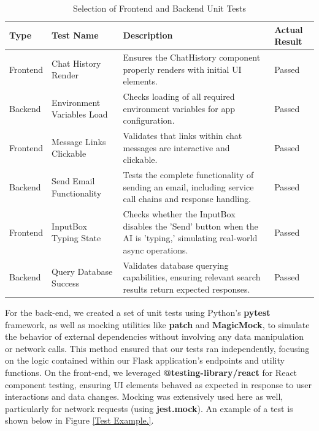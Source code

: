 \documentclass{l4proj}
\begin{document}
\begin{table}[htbp]
\centering
\renewcommand{\arraystretch}{1} %
\begin{tabular}{
    |>{\centering\arraybackslash}p{2cm}
    |>{\centering\arraybackslash}p{2cm}
    |p{6.5cm}
    |>{\centering\arraybackslash}p{2cm}|}
\hline
\rowcolor{HeaderColor}Type & Test Name & Description & Actual Result \\
\hline
\rowcolor{RowColor}Frontend & Chat History Render & Ensures the ChatHistory component properly renders with initial UI elements. & Passed \\
\hline
Backend & Environment Variables Load & Checks loading of all required environment variables for app configuration. & Passed \\
\hline
\rowcolor{RowColor}Frontend & Message Links Clickable & Validates that links within chat messages are interactive and clickable. & Passed \\
\hline
Backend & Send Email Functionality & Tests the complete functionality of sending an email, including service call chains and response handling. & Passed \\
\hline
\rowcolor{RowColor}Frontend & InputBox Typing State & Checks whether the InputBox disables the 'Send' button when the AI is 'typing,' simulating real-world async operations. & Passed \\
\hline
Backend & Query Database Success & Validates database querying capabilities, ensuring relevant search results return expected responses. & Passed \\
\hline
\end{tabular}
\caption{Selection of Frontend and Backend Unit Tests}
\label{table:Sample Tests}
\end{table}


For the back-end, we created a set of unit tests using Python's \textbf{pytest} framework, as well as mocking utilities like \textbf{patch} and \textbf{MagicMock}, to simulate the behavior of external dependencies without involving any data manipulation or network calls. This method ensured that our tests ran independently, focusing on the logic contained within our Flask application's endpoints and utility functions.
On the front-end, we leveraged \textbf{@testing-library/react} for React component testing, ensuring UI elements behaved as expected in response to user interactions and data changes. Mocking was extensively used here as well, particularly for network requests (using \textbf{jest.mock}). An example of a test is shown below in Figure \ref{Test Example.}.
\end{document}
